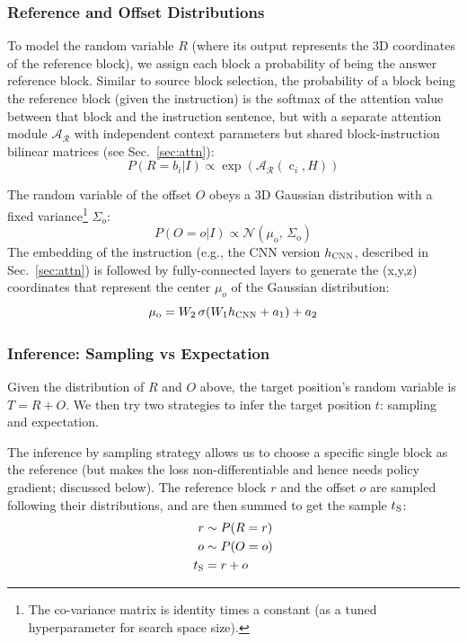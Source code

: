 \documentclass[letterpaper]{article} %
\DeclareMathOperator{\embb}{c}
\begin{document}
\subsubsection{Reference and Offset Distributions}
To model the random variable $R$ (where its output represents the 3D coordinates of the reference block), we assign each block a probability of being the answer reference block.
Similar to source block selection, the probability of a block being the reference block (given the instruction) is the softmax of the attention value between that block and the instruction sentence, but with a separate attention module $\mathcal{A_R}$ with independent context parameters but shared block-instruction bilinear matrices (see Sec.~\ref{sec:attn}):
\begin{equation}
P(R=b_i | I) \propto \exp(\mathcal{A_R}(\embb_i, H))
\end{equation}

The random variable of the offset $O$ obeys a 3D Gaussian distribution with a fixed variance\footnote{The co-variance matrix is identity times a constant (as a tuned hyperparameter for search space size).} $\Sigma_o$:
\begin{equation}
P(O = o | I) \propto \mathcal{N}(\mu_\text{o},\, \Sigma_\text{o})
\end{equation}
The embedding of the instruction (e.g., the CNN version $h_{\textsc{CNN}}$, described in Sec.~\ref{sec:attn}) is followed by fully-connected layers to generate the (x,y,z) coordinates that represent the center $\mu_o$ of the Gaussian distribution:
\begin{equation}
\mu_\text{o} = W_2 \, \sigma(W_1 h_{\textsc{CNN}} + a_1) + a_2
\end{equation}

\subsubsection{Inference: Sampling vs Expectation}
\label{sec:inference}
Given the distribution of $R$ and $O$ above, the target position's random variable is $T = R  + O$. We then try two strategies to infer the target position $t$: sampling and expectation.

The inference by sampling strategy allows us to choose a specific single block as the reference (but makes the loss non-differentiable and hence needs policy gradient; discussed below). The reference block $r$ and the offset $o$ are sampled following their distributions, and are then summed to get the sample $t_\textsc{S}$:
\begin{align}
r & \sim P(R = r) \\
o & \sim P(O = o) \\
t_\textsc{S} & = r + o
\end{align}
\end{document}
